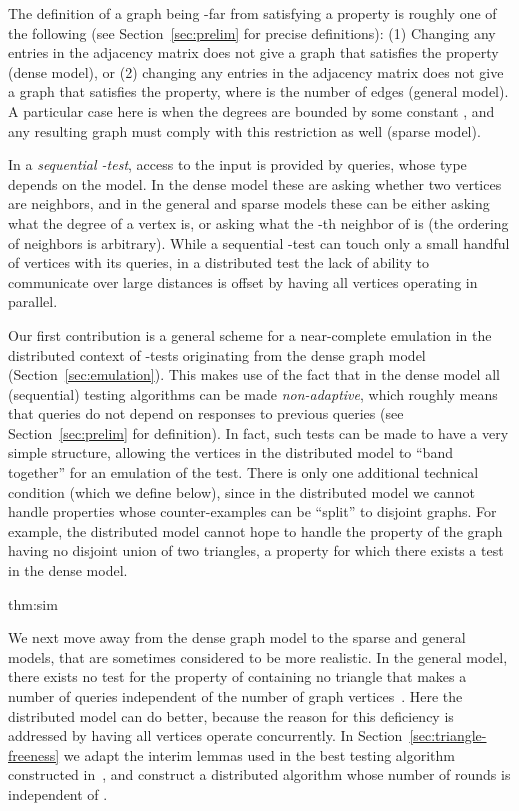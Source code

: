 \documentclass[11pt]{article}
\newenvironment{theorem-repeat}[1]{\begin{trivlist}
		\item[\hspace{\labelsep}{\bf\noindent Theorem \ref{#1} }]\em }{\end{trivlist}}
\begin{document}
The definition of a graph being -far from satisfying a property is roughly one of the following (see Section~\ref{sec:prelim} for precise definitions): (1) Changing any  entries in the adjacency matrix does not give a graph that satisfies the property (dense model), or (2) changing any  entries in the adjacency matrix does not give a graph that satisfies the property, where  is the number of edges (general model). A particular case here is when the degrees are bounded by some constant , and any resulting graph must comply with this restriction as well (sparse model).



In a \emph{sequential -test}, access to the input is provided by queries, whose type depends on the model. In the dense model these are asking whether two vertices  are neighbors, and in the general and sparse models these can be either asking what the degree of a vertex  is, or asking what the -th neighbor of  is (the ordering of neighbors is arbitrary). While a sequential -test can touch only a small handful of vertices with its queries, in a distributed test the lack of ability to communicate over large distances is offset by having all  vertices operating in parallel.



Our first contribution is a general scheme for a near-complete emulation in the distributed context of -tests originating from the dense graph model (Section~\ref{sec:emulation}). This makes use of the fact that in the dense model all (sequential) testing algorithms can be made \emph{non-adaptive}, which roughly means that queries do not depend on responses to previous queries (see Section~\ref{sec:prelim} for definition).
In fact, such tests can be made to have a very simple structure, allowing the vertices in the distributed model to ``band together'' for an emulation of the test. There is only one additional technical condition (which we define below), since in the distributed model we cannot handle properties whose counter-examples can be ``split'' to disjoint graphs. For example, the distributed model cannot hope to handle the property of the graph having no disjoint union of two triangles, a property for which there exists a test in the dense model.

\begin{theorem-repeat}{thm:sim}
\ThmSim
\end{theorem-repeat}

We next move away from the dense graph model to the sparse and general models, that are sometimes considered to be more realistic. In the general model, there exists no test for the property of containing no triangle that makes a number of queries independent of the number of graph vertices~\cite{AKKR}. Here the distributed model can do better, because the reason for this deficiency is addressed by having all vertices operate concurrently. In Section~\ref{sec:triangle-freeness} we adapt the interim lemmas used in the best testing algorithm constructed in~\cite{AKKR}, and construct a distributed algorithm whose number of rounds is independent of .
\end{document}
